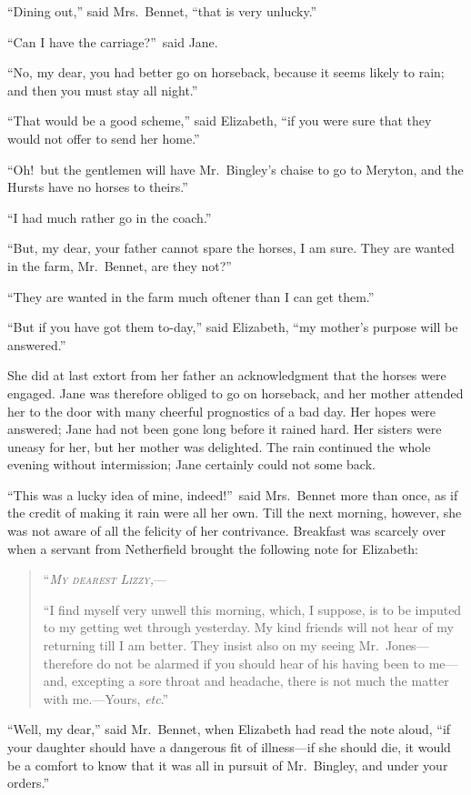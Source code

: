 \documentclass[12pt,english]{book}
\newcommand{\noun}[1]{\textsc{#1}}
\begin{document}
{}``Dining out,'' said Mrs.\ Bennet, {}``that is very unlucky.''

{}``Can I have the carriage?''\ said Jane.

{}``No, my dear, you had better go on horseback, because it seems
likely to rain; and then you must stay all night.''

{}``That would be a good scheme,'' said Elizabeth, {}``if you were
sure that they would not offer to send her home.''

{}``Oh!\ but the gentlemen will have Mr.\ Bingley's chaise to go
to Meryton, and the Hursts have no horses to theirs.''

{}``I had much rather go in the coach.''

{}``But, my dear, your father cannot spare the horses, I am sure.
They are wanted in the farm, Mr.\ Bennet, are they not?''\ 

{}``They are wanted in the farm much oftener than I can get them.''

{}``But if you have got them to-day,'' said Elizabeth, {}``my mother's
purpose will be answered.''

She did at last extort from her father an acknowledgment that the
horses were engaged. Jane was therefore obliged to go on horseback,
and her mother attended her to the door with many cheerful prognostics
of a bad day. Her hopes were answered; Jane had not been gone long
before it rained hard. Her sisters were uneasy for her, but her mother
was delighted. The rain continued the whole evening without intermission;
Jane certainly could not some back.

{}``This was a lucky idea of mine, indeed!''\ said Mrs.\ Bennet
more than once, as if the credit of making it rain were all her own.
Till the next morning, however, she was not aware of all the felicity
of her contrivance. Breakfast was scarcely over when a servant from
Netherfield brought the following note for Elizabeth:

\begin{quotation}
\noindent {}``\textit{\emph{\noun{My}}} \textit{\emph{\noun{dearest}}}
\textit{\emph{\noun{Lizzy}}}\emph{\noun{,}}---

{}``I find myself very unwell this morning, which, I suppose, is
to be imputed to my getting wet through yesterday. My kind friends
will not hear of my returning till I am better. They insist also on
my seeing Mr.\ Jones\mbox{---}therefore do not be alarmed if you
should hear of his having been to me\mbox{---}and, excepting a sore
throat and headache, there is not much the matter with me.\mbox{---}Yours,
\textit{etc}.'' 
\end{quotation}
{}``Well, my dear,'' said Mr.\ Bennet, when Elizabeth had read
the note aloud, {}``if your daughter should have a dangerous fit
of illness\mbox{---}if she should die, it would be a comfort to know
that it was all in pursuit of Mr.\ Bingley, and under your orders.''
\end{document}
